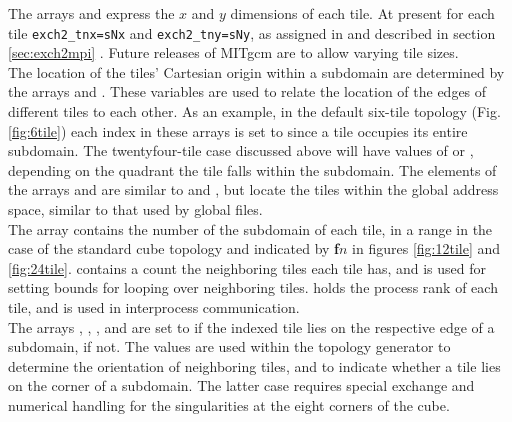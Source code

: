 The arrays  and
 express the $x$ and $y$ dimensions of
each tile.  At present for each tile \texttt{exch2\_tnx=sNx} and
\texttt{exch2\_tny=sNy}, as assigned in  and described in
section \ref{sec:exch2mpi} .  Future releases of MITgcm are to allow varying tile
sizes. \\

The location of the tiles' Cartesian origin within a subdomain are
determined by the arrays  and
.  These variables are used to
relate the location of the edges of different tiles to each other.  As
an example, in the default six-tile topology (Fig. \ref{fig:6tile})
each index in these arrays is set to  since a tile occupies
its entire subdomain.  The twentyfour-tile case discussed above will
have values of  or , depending on the quadrant the
tile falls within the subdomain.  The elements of the arrays
 and
 are similar to
 and
, but locate the tiles within the
global address space, similar to that used by global files. \\

The array  contains the number of
the subdomain of each tile, in a range  in the case of the
standard cube topology and indicated by \textbf{\textsf{f}}$n$ in
figures \ref{fig:12tile} and
\ref{fig:24tile}. 
contains a count the  neighboring tiles each tile has, and is
used for setting bounds for looping over neighboring tiles.
 holds the process rank of each
tile, and is used in interprocess communication.  \\


The arrays ,
,
, and
 are set to  if the
indexed tile lies on the respective edge of a subdomain,  if
not.  The values are used within the topology generator to determine
the orientation of neighboring tiles, and to indicate whether a tile
lies on the corner of a subdomain.  The latter case requires special
exchange and numerical handling for the singularities at the eight
corners of the cube. \\


